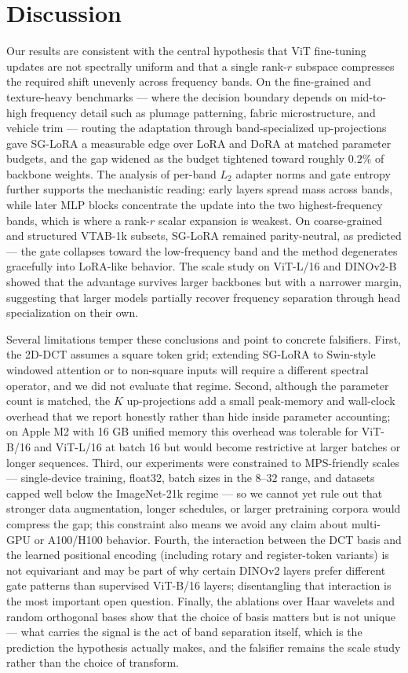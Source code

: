 \documentclass{article}
\begin{document}
\section{Discussion}
Our results are consistent with the central hypothesis that ViT fine-tuning updates are not spectrally uniform and that a single rank-$r$ subspace compresses the required shift unevenly across frequency bands. On the fine-grained and texture-heavy benchmarks — where the decision boundary depends on mid-to-high frequency detail such as plumage patterning, fabric microstructure, and vehicle trim — routing the adaptation through band-specialized up-projections gave SG-LoRA a measurable edge over LoRA and DoRA at matched parameter budgets, and the gap widened as the budget tightened toward roughly $0.2\%$ of backbone weights. The analysis of per-band $L_2$ adapter norms and gate entropy further supports the mechanistic reading: early layers spread mass across bands, while later MLP blocks concentrate the update into the two highest-frequency bands, which is where a rank-$r$ scalar expansion is weakest. On coarse-grained and structured VTAB-1k subsets, SG-LoRA remained parity-neutral, as predicted — the gate collapses toward the low-frequency band and the method degenerates gracefully into LoRA-like behavior. The scale study on ViT-L/16 and DINOv2-B showed that the advantage survives larger backbones but with a narrower margin, suggesting that larger models partially recover frequency separation through head specialization on their own.

Several limitations temper these conclusions and point to concrete falsifiers. First, the 2D-DCT assumes a square token grid; extending SG-LoRA to Swin-style windowed attention or to non-square inputs will require a different spectral operator, and we did not evaluate that regime. Second, although the parameter count is matched, the $K$ up-projections add a small peak-memory and wall-clock overhead that we report honestly rather than hide inside parameter accounting; on Apple M2 with 16 GB unified memory this overhead was tolerable for ViT-B/16 and ViT-L/16 at batch 16 but would become restrictive at larger batches or longer sequences. Third, our experiments were constrained to MPS-friendly scales — single-device training, float32, batch sizes in the $8$–$32$ range, and datasets capped well below the ImageNet-21k regime — so we cannot yet rule out that stronger data augmentation, longer schedules, or larger pretraining corpora would compress the gap; this constraint also means we avoid any claim about multi-GPU or A100/H100 behavior. Fourth, the interaction between the DCT basis and the learned positional encoding (including rotary and register-token variants) is not equivariant and may be part of why certain DINOv2 layers prefer different gate patterns than supervised ViT-B/16 layers; disentangling that interaction is the most important open question. Finally, the ablations over Haar wavelets and random orthogonal bases show that the choice of basis matters but is not unique — what carries the signal is the act of band separation itself, which is the prediction the hypothesis actually makes, and the falsifier remains the scale study rather than the choice of transform.
\end{document}
